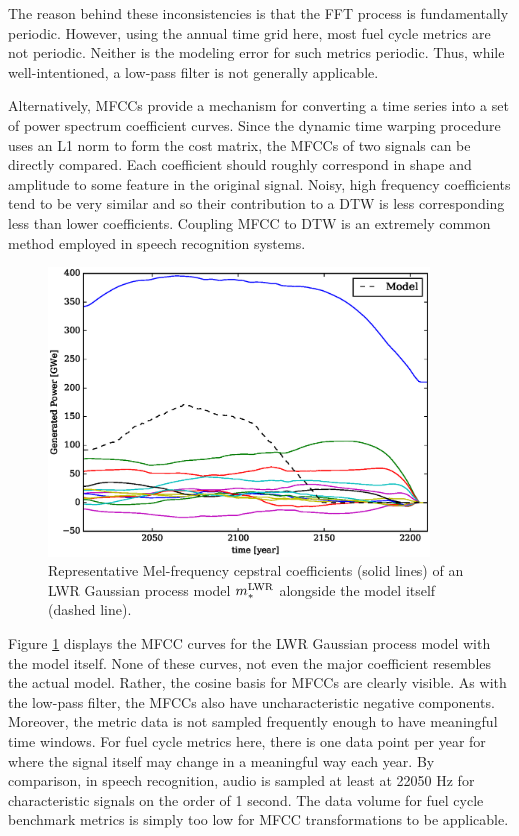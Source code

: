 The reason behind these inconsistencies is that the FFT process is fundamentally 
periodic.  However, using the annual time grid here, most fuel cycle metrics 
are not periodic. Neither is the modeling error for such metrics periodic. 
Thus, while well-intentioned, a low-pass filter is not generally applicable.

Alternatively, MFCCs provide a mechanism for converting a time series into a 
set of power spectrum coefficient curves. Since the dynamic time warping procedure
uses an L1 norm to form the cost matrix, the MFCCs of two signals can be directly 
compared. Each coefficient should roughly correspond in shape and amplitude to some
feature in the original signal.  Noisy, high frequency coefficients tend to be 
very similar and so their contribution to a DTW is less corresponding less than 
lower coefficients. Coupling MFCC to DTW is an extremely common method employed in 
speech recognition systems.  

\begin{figure}[htb]
\centering
\includegraphics[width=0.9\textwidth]{mfcc-lwr-model.eps}
\caption{Representative Mel-frequency cepstral coefficients (solid lines) of an 
LWR Gaussian process model $m_*^{\mathrm{LWR}}$ alongside the model itself (dashed line).}
\label{mfcc-lwr-model}
\end{figure}

Figure \ref{mfcc-lwr-model} displays the MFCC curves for the LWR Gaussian 
process model with the model itself. None of these curves, not even the major 
coefficient resembles the actual model.  Rather, the cosine basis for MFCCs
are clearly visible.  As with the low-pass filter, the MFCCs also have 
uncharacteristic negative components.  Moreover, 
the metric data is not sampled frequently enough to have meaningful
time windows. For fuel cycle metrics here, there is one data point per year for 
where the signal itself may change in a meaningful way each year. By comparison, 
in speech recognition, audio is sampled at least at 22050 Hz for characteristic 
signals on the order of 1 second.  The data volume for fuel cycle benchmark metrics
is simply too low for MFCC transformations to be applicable. 

